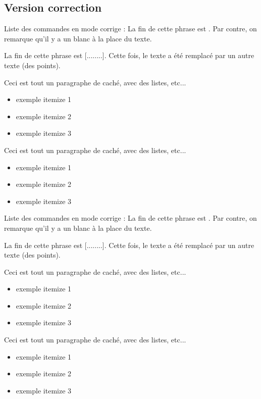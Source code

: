\documentclass[a4paper,12pt]{article}
\begin{document}
	\subsection{Version correction}

\begin{code}
Liste des commandes en mode corrige :
La fin de cette phrase est . Par contre, on remarque qu'il y a un blanc à la place du texte.

La fin de cette phrase est [........]. Cette fois, le texte a été remplacé par un autre texte (des points).

\begin{bigReponse}
	Ceci est tout un paragraphe de caché,
	avec des listes, etc...
	\begin{itemize}
		\item exemple itemize 1
		\item exemple itemize 2
		\item exemple itemize 3
	\end{itemize}
\end{bigReponse}
\begin{bigReponse}
	Ceci est tout un paragraphe de caché,
	avec des listes, etc...
	\begin{itemize}
		\item exemple itemize 1
		\item exemple itemize 2
		\item exemple itemize 3
	\end{itemize}
\end{bigReponse}
\end{code}




Liste des commandes en mode corrige :
La fin de cette phrase est . Par contre, on remarque qu'il y a un blanc à la place du texte.

La fin de cette phrase est [........]. Cette fois, le texte a été remplacé par un autre texte (des points).

\begin{bigReponse}
	Ceci est tout un paragraphe de caché,
	avec des listes, etc...
	\begin{itemize}
		\item exemple itemize 1
		\item exemple itemize 2
		\item exemple itemize 3
	\end{itemize}
\end{bigReponse}
\begin{bigReponse}
	Ceci est tout un paragraphe de caché,
	avec des listes, etc...
	\begin{itemize}
		\item exemple itemize 1
		\item exemple itemize 2
		\item exemple itemize 3
	\end{itemize}
\end{bigReponse}
\end{document}
